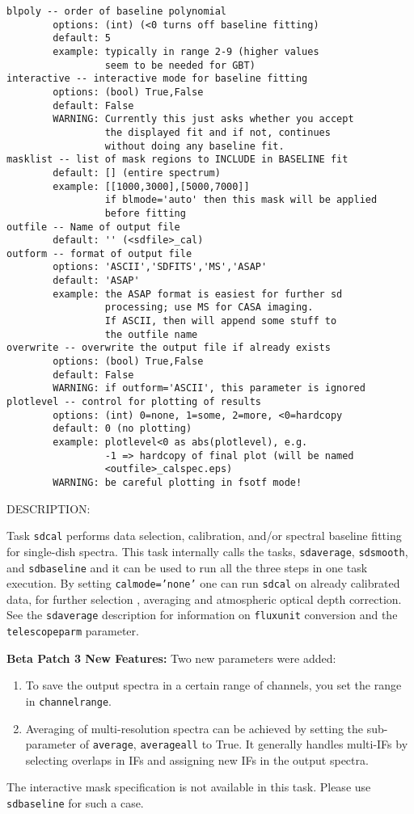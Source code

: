 \begin{verbatim}
blpoly -- order of baseline polynomial
        options: (int) (<0 turns off baseline fitting)
        default: 5
        example: typically in range 2-9 (higher values
                 seem to be needed for GBT)
interactive -- interactive mode for baseline fitting
        options: (bool) True,False
        default: False
        WARNING: Currently this just asks whether you accept
                 the displayed fit and if not, continues
                 without doing any baseline fit.
masklist -- list of mask regions to INCLUDE in BASELINE fit
        default: [] (entire spectrum)
        example: [[1000,3000],[5000,7000]]
                 if blmode='auto' then this mask will be applied
                 before fitting
outfile -- Name of output file
        default: '' (<sdfile>_cal)
outform -- format of output file
        options: 'ASCII','SDFITS','MS','ASAP'
        default: 'ASAP'
        example: the ASAP format is easiest for further sd
                 processing; use MS for CASA imaging.
                 If ASCII, then will append some stuff to
                 the outfile name
overwrite -- overwrite the output file if already exists
        options: (bool) True,False
        default: False
        WARNING: if outform='ASCII', this parameter is ignored
plotlevel -- control for plotting of results
        options: (int) 0=none, 1=some, 2=more, <0=hardcopy
        default: 0 (no plotting)
        example: plotlevel<0 as abs(plotlevel), e.g.
                 -1 => hardcopy of final plot (will be named
                 <outfile>_calspec.eps)
        WARNING: be careful plotting in fsotf mode!
\end{verbatim}
    
DESCRIPTION:

    Task {\tt sdcal} performs data selection, calibration, and/or spectral
    baseline fitting for single-dish spectra. This task internally calls the
    tasks, {\tt sdaverage}, {\tt sdsmooth}, and {\tt sdbaseline} and it can be used to run all the
    three steps in one task execution.
    By setting {\tt calmode='none'}
    one can run {\tt sdcal} on already calibrated data, for further selection
    , averaging and atmospheric optical depth correction.
    See the {\tt sdaverage} description for information on {\tt fluxunit} 
    conversion and the {\tt telescopeparm} parameter.
       

    {\bf Beta Patch 3 New Features:}
    Two new parameters were added:
    \begin{enumerate}
    \item To save the output spectra  in a certain range of 
    channels, you set the range in {\tt channelrange}. 
    \item Averaging of multi-resolution
    spectra can be achieved by setting the sub-parameter of {\tt average}, {\tt averageall} 
    to True. It generally handles multi-IFs by selecting overlaps in IFs and assigning
    new IFs in the output spectra. 
    \end{enumerate}
    The interactive mask specification is not available 
    in this task. Please use {\tt sdbaseline} for such a case.

